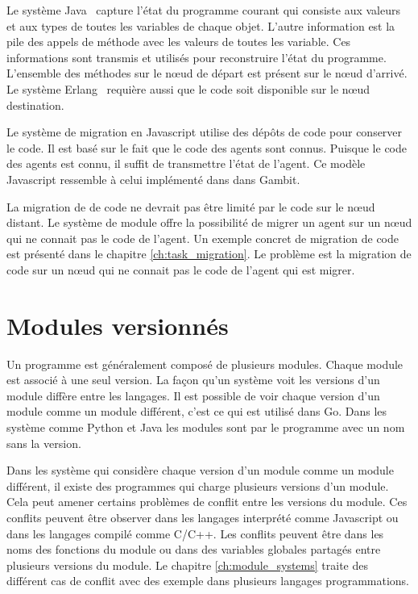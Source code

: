 Le système Java~\cite{And98transparentmigration} capture l'état du programme courant
qui consiste aux valeurs et aux types de toutes les variables de chaque objet. L'autre
information est la pile des appels de méthode avec les valeurs de toutes les variable.
Ces informations sont transmis et utilisés pour reconstruire l'état du programme.
L'ensemble des méthodes sur le nœud de départ est présent sur le nœud d'arrivé.
Le système Erlang~\cite{M_mobileintelligent} requière aussi que le code soit disponible
sur le nœud destination.

Le système de migration en Javascript utilise des dépôts de code pour
conserver le code. Il est basé sur le fait que le code des agents
sont connus. Puisque le code des agents est connu, il suffit de transmettre
l'état de l'agent. Ce modèle Javascript ressemble à celui implémenté dans
dans Gambit.

La migration de de code ne devrait pas être limité par le code sur le nœud
distant. Le système de module offre la possibilité de migrer un agent sur un
nœud qui ne connait pas le code de l'agent. Un exemple concret de migration
de code est présenté dans le chapitre \ref{ch:task_migration}. Le problème
est la migration de code sur un nœud qui ne connait pas le code de l'agent qui
est migrer.


\section{Modules versionnés}
%
Un programme est généralement composé de plusieurs modules. Chaque module est
associé à une seul version. La façon qu'un système voit les versions d'un
module diffère entre les langages. Il est possible de voir chaque version d'un
module comme un module différent, c'est ce qui est utilisé dans Go. Dans les
système comme Python et Java les modules sont par le programme avec un nom sans
la version.

Dans les système qui considère chaque version d'un module comme un module différent,
il existe des programmes qui charge plusieurs versions d'un module. Cela peut amener
certains problèmes de conflit entre les versions du module. Ces conflits peuvent être
observer dans les langages interprété comme Javascript ou dans les langages compilé
comme C/C++. Les conflits peuvent être dans les noms des fonctions du module ou
dans des variables globales partagés entre plusieurs versions du module. Le chapitre
\ref{ch:module_systems} traite des différent cas de conflit avec des exemple
dans plusieurs langages programmations.

